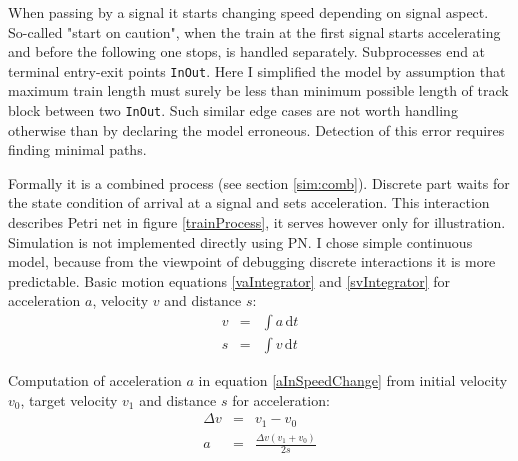 \documentclass[english]{cls/fitthesis}
\newcommand{\dv}{\Delta v}
\newcommand{\cfr}[1]{\texttt{#1}}
\newcommand{\sourceRef}[1]{\cfr{#1}}
\begin{document}
      When passing by a signal it starts changing speed depending on signal aspect.
      So-called "start on caution", when the train at the first signal starts accelerating and before
      the following one stops, is handled separately. Subprocesses end at terminal
      entry-exit points \sourceRef{InOut}. Here I simplified the model by assumption
      that maximum train length must surely be less than minimum possible length of track block between two
      \sourceRef{InOut}. Such similar edge cases are not worth handling otherwise than by declaring the model
      erroneous. Detection of this error requires finding minimal paths.

      Formally it is a combined process (see section \ref{sim:comb}). Discrete part waits for the state condition
      of arrival at a signal and sets acceleration. This interaction describes Petri net in figure \ref{trainProcess},
      it serves however only for illustration. Simulation is not implemented directly using PN.
      I chose simple continuous model, because from the viewpoint of debugging discrete interactions
      it is more predictable.
      Basic motion equations \ref{vaIntegrator} and \ref{svIntegrator}
      for acceleration $a$, velocity $v$ and distance $s$:
	\nopagebreak
        \begin{eqnarray}
        v & = & \int{a\, \mathrm{d}t} \label{vaIntegrator}\\
        s & = & \int{v\, \mathrm{d}t} \label{svIntegrator}
        \end{eqnarray}

      Computation of acceleration $a$ in equation \ref{aInSpeedChange}
      from initial velocity $v_0$, target velocity $v_1$ and distance $s$ for acceleration:
      \nopagebreak
      \begin{eqnarray}
         \dv & = & v_1 - v_0 \nonumber \\
         a  & = & \frac{\dv (v_1 + v_0)}{2s} \label{aInSpeedChange}
      \end{eqnarray}
\end{document}
